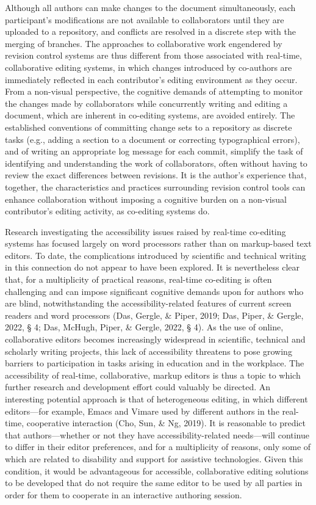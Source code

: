 \documentclass[11pt]{sig-alternate}
\begin{document}
\begin{large}
Although all authors can make changes to the document simultaneously, each participant’s modifications are not available to collaborators until they are uploaded to a repository, and conflicts are resolved in a discrete step with the merging of branches. The approaches to collaborative work engendered by revision control systems are thus different from those associated with real-time, collaborative editing systems, in which changes introduced by co-authors are immediately reflected in each contributor’s editing environment as they occur. From a non-visual perspective, the cognitive demands of attempting to monitor the changes made by collaborators while concurrently writing and editing a document, which are inherent in co-editing systems, are avoided entirely. The established conventions of committing change sets to a repository as discrete tasks (e.g., adding a section to a document or correcting typographical errors), and of writing an appropriate log message for each commit, simplify the task of identifying and understanding the work of collaborators, often without having to review the exact differences between revisions. It is the author’s experience that, together, the characteristics and practices surrounding revision control tools can enhance collaboration without imposing a cognitive burden on a non-visual contributor’s editing activity, as co-editing systems do.

Research investigating the accessibility issues raised by real-time co-editing systems has focused largely on word processors rather than on markup-based text editors. To date, the complications introduced by scientific and technical writing in this connection do not appear to have been explored. It is nevertheless clear that, for a multiplicity of practical reasons, real-time co-editing is often challenging and can impose significant cognitive demands upon for authors who are blind, notwithstanding the accessibility-related features of current screen readers and word processors (Das, Gergle, \& Piper, 2019; Das, Piper, \& Gergle, 2022, § 4; Das, McHugh, Piper, \& Gergle, 2022, § 4). As the use of online, collaborative editors becomes increasingly widespread in scientific, technical and scholarly writing projects, this lack of accessibility threatens to pose growing barriers to participation in tasks arising in education and in the workplace. The accessibility of real-time, collaborative, markup editors is thus a topic to which further research and development effort could valuably be directed. An interesting potential approach is that of heterogeneous editing, in which different editors—for example, Emacs and Vimare used by different authors in the real-time, cooperative interaction (Cho, Sun, \& Ng, 2019). It is reasonable to predict that authors—whether or not they have accessibility-related needs—will continue to differ in their editor preferences, and for a multiplicity of reasons, only some of which are related to disability and support for assistive technologies. Given this condition, it would be advantageous for accessible, collaborative editing solutions to be developed that do not require the same editor to be used by all parties in order for them to cooperate in an interactive authoring session.


\end{large}
\end{document}
